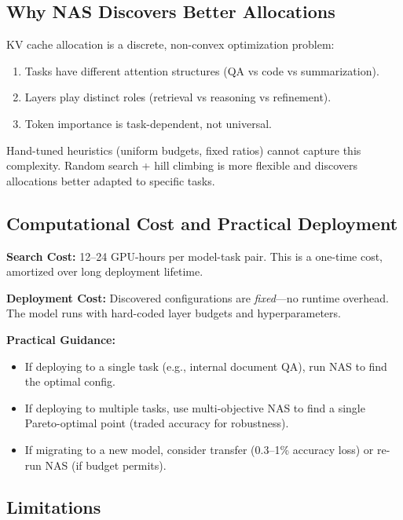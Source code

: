 \documentclass[11pt,a4paper]{article}
\begin{document}
\subsection{Why NAS Discovers Better Allocations}

KV cache allocation is a discrete, non-convex optimization problem:
\begin{enumerate}
    \item Tasks have different attention structures (QA vs code vs summarization).
    \item Layers play distinct roles (retrieval vs reasoning vs refinement).
    \item Token importance is task-dependent, not universal.
\end{enumerate}

Hand-tuned heuristics (uniform budgets, fixed ratios) cannot capture this complexity. Random search + hill climbing is more flexible and discovers allocations better adapted to specific tasks.

\subsection{Computational Cost and Practical Deployment}

\textbf{Search Cost:} 12–24 GPU-hours per model-task pair. This is a one-time cost, amortized over long deployment lifetime.

\textbf{Deployment Cost:} Discovered configurations are \emph{fixed}—no runtime overhead. The model runs with hard-coded layer budgets and hyperparameters.

\textbf{Practical Guidance:}
\begin{itemize}
    \item If deploying to a single task (e.g., internal document QA), run NAS to find the optimal config.
    \item If deploying to multiple tasks, use multi-objective NAS to find a single Pareto-optimal point (traded accuracy for robustness).
    \item If migrating to a new model, consider transfer (0.3–1\% accuracy loss) or re-run NAS (if budget permits).
\end{itemize}

\subsection{Limitations}
\end{document}
